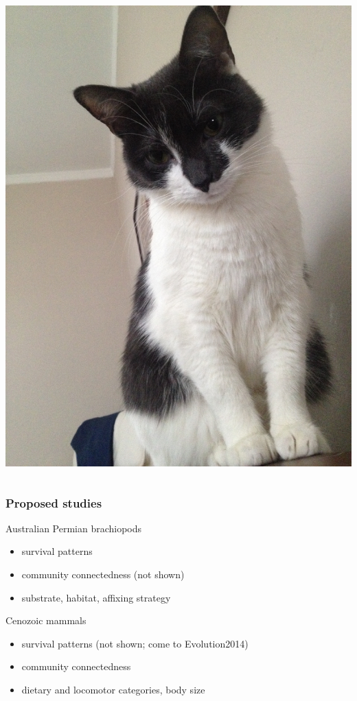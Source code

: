 \documentclass{beamer}
\begin{document}
\begin{frame}
\begin{columns}
\begin{column}{0.5\textwidth}
\begin{center}
        \includegraphics[height = 0.4\textheight, keepaspectratio = true]{figure/annyong}
      \end{center}
    \end{column}
  \end{columns}
\end{frame}

\begin{frame}
  \frametitle{Proposed studies}

  Australian Permian brachiopods
  \begin{itemize}
    \item survival patterns
    \item community connectedness (not shown)
    \item substrate, habitat, affixing strategy
  \end{itemize}

  \vspace{1cm}

  Cenozoic mammals
  \begin{itemize}
    \item survival patterns (not shown; come to Evolution2014)
    \item community connectedness
    \item dietary and locomotor categories, body size
  \end{itemize}

\end{frame}
\end{document}
